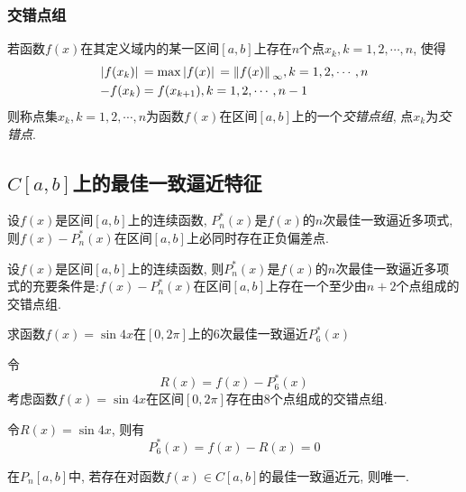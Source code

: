\subsubsection{交错点组}

\begin{definition}
    若函数$f(x)$在其定义域内的某一区间$[a,b]$上存在$n$个点${x_k},k=1,2,\cdots,n$, 使得
    \begin{align*}
        \abs*{f(x_k)}&=\max\abs*{f(x)}=\norm*{f(x)}_\infty, k=1,2,\cdots,n\\
        -f(x_k)&=f(x_{k+1}), k=1,2,\cdots,n-1
    \end{align*}
    则称点集${x_k},k=1,2,\cdots,n$为函数$f(x)$在区间$[a,b]$上的一个\emph{交错点组}, 点$x_k$为\emph{交错点}.
\end{definition}

\subsection{$C[a,b]$上的最佳一致逼近特征}

\begin{lemma}
    设$f(x)$是区间$[a,b]$上的连续函数, $P_n^*(x)$是$f(x)$的$n$次最佳一致逼近多项式, 则$f(x)-P_n^*(x)$在区间$[a,b]$上必同时存在正负偏差点.
\end{lemma}

\begin{theorem}[Chebyshev定理]
    设$f(x)$是区间$[a,b]$上的连续函数, 则$P_n^*(x)$是$f(x)$的$n$次最佳一致逼近多项式的充要条件是:$f(x)-P_n^*(x)$在区间$[a,b]$上存在一个至少由$n+2$个点组成的交错点组.
\end{theorem}

\begin{example}
    求函数$f(x)=\sin{4x}$在$[0,2\pi]$上的6次最佳一致逼近$P_6^*(x)$
\end{example}

\begin{solution}
    令
    \begin{equation*}
        R(x)=f(x)-P_6^*(x)
    \end{equation*}
    考虑函数$f(x)=\sin{4x}$在区间$[0,2\pi]$存在由8个点组成的交错点组.

    令$R(x)=\sin{4x}$, 则有
    \begin{equation*}
        P_6^*(x)=f(x)-R(x)=0
    \end{equation*}
\end{solution}

\begin{corollary}
    在$P_n[a,b]$中, 若存在对函数$f(x)\in C[a,b]$的最佳一致逼近元, 则唯一.
\end{corollary}

